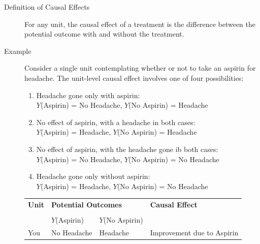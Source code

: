 \documentclass[a4paper,10pt,landscape]{article}
\begin{document}
\begin{multicols*}{3}
\begin{description}
	\item[Definition of Causal Effects] For any unit, the causal effect of a treatment is the difference between the potential outcome with and without the treatment.
	\item[Example] Consider a single unit contemplating whether or not to take an aspirin for headache. The unit-level causal effect involves one of four possibilities:
	\begin{enumerate}
		\item Headache gone only with aspirin:\\
		$Y$(Aspirin) = No Headache, $Y$(No Aspirin) = Headache
		\item No effect of aspirin, with a headache in both cases:\\
		$Y$(Aspirin) = Headache, $Y$(No Aspirin) = Headache
		\item No effect of aspirin, with the headache gone ib both cases:\\
		$Y$(Aspirin) = No Headache, $Y$(No Aspirin) = No Headache
		\item Headache gone only without aspirin:\\
		$Y$(Aspirin) = Headache, $Y$(No Aspirin) = No Headache
	\end{enumerate}

	\begin{minipage}[h]{\columnwidth}
		\centering
		\begin{tabular}{llll}
			\toprule[\heavyrulewidth]\toprule[\heavyrulewidth]
			\textbf{Unit} & \multicolumn{2}{l}{\textbf{Potential Outcomes}} & \textbf{Causal Effect} \\ \cline{2-3}
			\\[-0.5em]
			& $Y$(Aspirin)& $Y$(No Aspirin)&\\
			\midrule
			You & No Headache & Headache & Improvement due to Aspirin \\
			\bottomrule[\heavyrulewidth]\bottomrule[\heavyrulewidth]
		\end{tabular}
	\end{minipage}


\end{description}
\end{multicols*}
\end{document}
